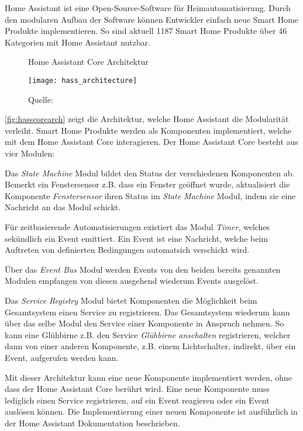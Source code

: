 Home Assistant ist eine Open-Source-Software für Heimautomatisierung.
Durch den modularen Aufbau der Software können Entwickler einfach neue Smart Home Produkte implementieren.
So sind aktuell 1187 Smart Home Produkte über 46 Kategorien mit Home Assistant nutzbar.

\begin{figure}[ht]
	\centering
	\caption{Home Assistant Core Architektur}
	\texttt{[image: hass\_architecture]}
	\caption*{\footnotesize{Quelle: }}
	\label{fig:hasscorearch}
\end{figure}

\autoref{fig:hasscorearch} zeigt die Architektur, welche Home Assistant die Modularität verleiht.
Smart Home Produkte werden als Komponenten implementiert, welche mit dem Home Assistant Core interagieren.
Der Home Assistant Core besteht aus vier Modulen:

Das \textit{State Machine} Modul bildet den Status der verschiedenen Komponenten ab.
Bemerkt ein Fenstersensor z.B. dass ein Fenster geöffnet wurde, aktualisiert die Komponente \textit{Fenstersensor} ihren Status im \textit{State Machine} Modul, indem sie eine Nachricht an das Modul schickt.

Für zeitbasierende Automatisierungen existiert das Modul \textit{Timer}, welches sekündlich ein Event emittiert.
Ein Event ist eine Nachricht, welche beim Auftreten von definierten Bedingungen automatsich verschickt wird.

Über das \textit{Event Bus} Modul werden Events von den beiden bereits genannten Modulen empfangen von diesen ausgehend wiederum Events ausgelöst.

Das \textit{Service Registry} Modul bietet Komponenten die Möglichkeit beim Gesamtsystem einen Service zu registrieren.
Das Gesamtsystem wiederum kann über das selbe Modul den Service einer Komponente in Anspruch nehmen.
So kann eine Glühbirne z.B. den Service \textit{Glühbirne anschalten} registrieren, welcher dann von einer anderen Komponente, z.B. einem Lichtschalter, indirekt, über ein Event, aufgerufen werden kann.

Mit dieser Architektur kann eine neue Komponente implementiert werden, ohne dass der Home Assistant Core berührt wird.
Eine neue Komponente muss lediglich einen Service registrieren, auf ein Event reagieren oder ein Event auslösen können.
Die Implementierung einer neuen Komponente ist ausführlich in der Home Assistant Dokumentation beschrieben.

